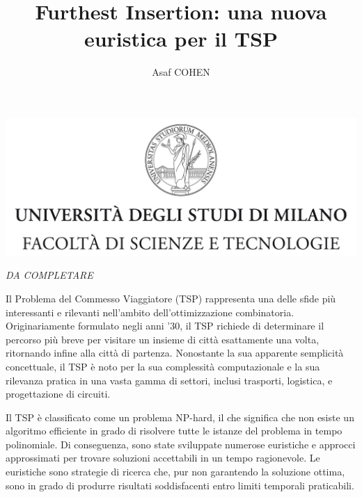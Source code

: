 \documentclass[a4paper,12pt]{report}
\begin{document}
\includegraphics{tesiSCIENZE_TECNOLOGIE.jpg}
\title{Furthest Insertion: una nuova euristica per il TSP}
\author{Asaf COHEN}
%
% 
%

\beforepreface

\clearpage
\null
\thispagestyle{empty}
\clearpage

        { \Large {\sl DA COMPLETARE}}
% 
%

\clearpage
\null
\thispagestyle{empty}
\clearpage

Il Problema del Commesso Viaggiatore (TSP) rappresenta una delle sfide più interessanti e rilevanti nell'ambito dell'ottimizzazione combinatoria. Originariamente formulato negli anni '30, il TSP richiede di determinare il percorso più breve per visitare un insieme di città esattamente una volta, ritornando infine alla città di partenza. Nonostante la sua apparente semplicità concettuale, il TSP è noto per la sua complessità computazionale e la sua rilevanza pratica in una vasta gamma di settori, inclusi trasporti,  logistica, e progettazione di circuiti.

Il TSP è classificato come un problema NP-hard, il che significa che non esiste un algoritmo efficiente in grado di risolvere tutte le istanze del problema in tempo polinomiale. Di conseguenza, sono state sviluppate numerose euristiche e approcci approssimati per trovare soluzioni accettabili in un tempo ragionevole. Le euristiche sono strategie di ricerca che, pur non garantendo la soluzione ottima, sono in grado di produrre risultati soddisfacenti entro limiti temporali praticabili.
\end{document}
